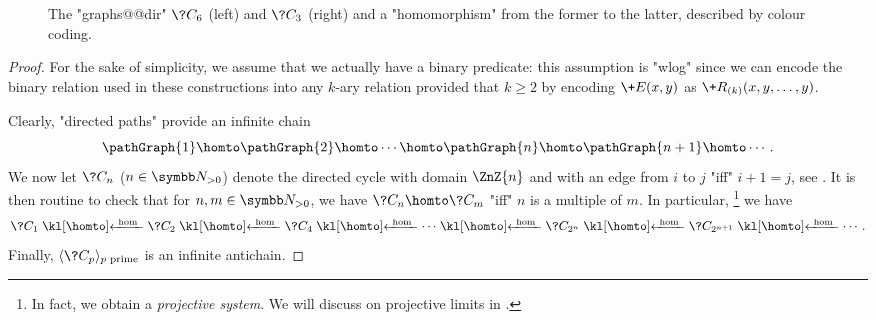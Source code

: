 \begin{figure}
	\centering
	\caption{\AP\label{fig:prelim-db-cycles} The "graphs@@dir" $\?C_6$
	(left) and $\?C_3$ (right) and a "homomorphism" from the former
	to the latter, described by colour coding.}
\end{figure}
\begin{proof}
	For the sake of simplicity, we assume that we actually have
	a binary predicate: this assumption is "wlog" since we can encode the binary 
	relation used in these constructions into any $k$-ary
	relation provided that $k \geq 2$ by encoding $\+E(x,y)$
	as $\+R_{(k)}(x,y,\dotsc,y)$.

	Clearly, "directed paths" provide an infinite chain
	\[
		\pathGraph{1} \homto \pathGraph{2} \homto \cdots
			\homto \pathGraph{n} \homto \pathGraph{n+1} \homto \cdots.
	\]
	We now let $\?C_n$ ($n\in\Np$) denote the directed cycle with domain $\ZnZ{n}$
	and with an edge from $i$ to $j$ "iff" $i+1 = j$, see .
	It is then routine to check that for $n,m\in\Np$, we have $\?C_n \homto \?C_m$
	"iff" $n$ is a multiple of $m$. In particular,%
	\footnote{In fact, we obtain a \emph{projective system}. We will discuss
	on projective limits in .}
	we have
	\[
		\?C_1 \cohomto \?C_2 \cohomto \?C_4 \cohomto \cdots \cohomto \?C_{2^n} \cohomto \?C_{2^{n+1}} \cohomto \cdots.
	\]
	Finally, $\tup{\?C_p}_{p \text{ prime}}$ is an infinite antichain.
\end{proof}

